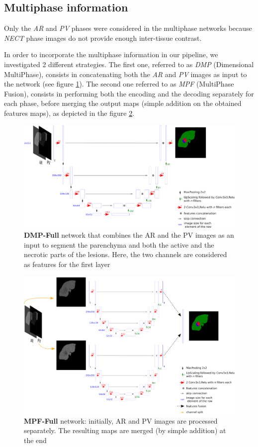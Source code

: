 \documentclass[]{article}
\newcommand{\pplfont}[1]{{\textbf{\fontfamily{ppl}\selectfont #1}}}
\begin{document}
	
	\subsection*{Multiphase information}
	
	Only the \emph{AR} and \emph{PV} phases were considered in the
	multiphase networks because \emph{NECT} phase images do not provide enough
	inter-tissue contrast.
	
	In order to incorporate the multiphase information in our pipeline, we
	investigated 2 different strategies. The first one, referred to as
	\emph{DMP} (Dimensional MultiPhase), consists in concatenating both the
	\emph{AR} and \emph{PV} images as input to the network (see figure \ref{CARS_DMP_Full_Fig}).
	The second one referred to as \emph{MPF} (MultiPhase Fusion), consists
	in performing both the encoding and the decoding separately for each
	phase, before merging the output maps (simple addition on the obtained
	features maps), as depicted in the figure \ref{CARS_MPF_Full_Fig}.
	
	\begin{figure}[th!]
		\centering
		\includegraphics[width=0.7\linewidth]{images/image28}
		\caption{\pplfont{DMP-Full} network that combines the AR and the PV images as an input to segment the parenchyma and both the active and the necrotic parts of the lesions. Here, the two channels are considered as features for the first layer}
		\label{CARS_DMP_Full_Fig}
	\end{figure}
	
	
	\begin{figure}[th!]
		\centering
		\includegraphics[width=0.7\linewidth]{images/image36}
		\caption{\pplfont{MPF-Full} network: initially, AR and PV images are processed separately. The resulting maps are merged (by simple addition) at the end}
		\label{CARS_MPF_Full_Fig}
	\end{figure}
	
\end{document}
